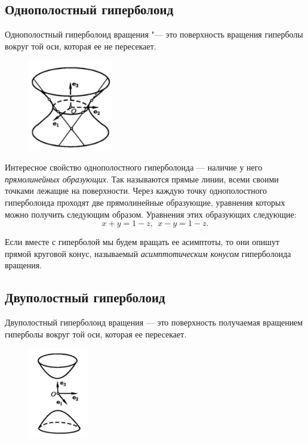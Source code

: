 \subsection*{Однополостный гиперболоид}

Однополостный гиперболоид вращения "--- это поверхность вращения гиперболы вокруг той оси, которая ее не пересекает.
\begin{figure}[H]
  \centering
  \includegraphics[height = 4cm]{images/second_hyperboloid_one.png}
\end{figure}
Интересное свойство однополостного гиперболоида — наличие у него \textit{прямолинейных образующих}. Так называются прямые линии, всеми своими точками лежащие на поверхности. Через каждую точку однополостного гиперболоида проходят две прямолинейные образующие, уравнения которых можно получить следующим образом. Уравнения этих образующих следующие: $$
  x + y = 1 - z, ~~ x - y = 1 - z. 
$$

Если вместе с гиперболой мы будем вращать ее асимптоты, то они опишут прямой круговой конус, называемый \textit{асимптотическим конусом} гиперболоида вращения.

\subsection*{Двуполостный гиперболоид}
Двуполостный гиперболоид вращения — это поверхность получаемая вращением
гиперболы вокруг той оси, которая ее пересекает.
\begin{figure}[H]
  \centering
  \includegraphics[height = 4cm]{images/second_hyperboloid_two.png}
\end{figure}

